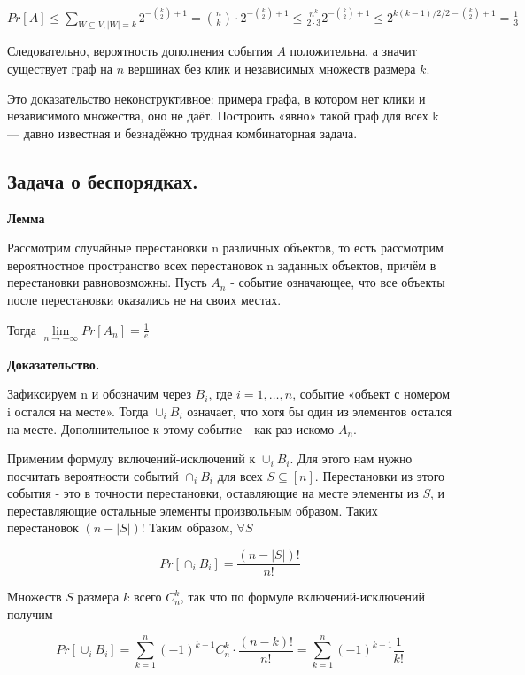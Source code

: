 \documentclass[a4paper, 10pt]{article}
\begin{document}
\begin{center}
    $\displaystyle Pr[A] \leqslant \sum_{W \subseteq V,|W| = k} 2^{-\binom{k}{2} + 1} = \binom{n}{k} \cdot 2^{-\binom{k}{2} + 1} \leqslant \frac{n^k}{2 \cdot 3} 2^{-\binom{k}{2} + 1} \leqslant 2^{k(k-1)/2 /2-\binom{k}{2} + 1} = \frac{1}{3}$
\end{center}

Следовательно, вероятность дополнения события $A$ положительна, а значит существует граф на $n$ вершинах без клик и независимых множеств размера $k$.

Это доказательство неконструктивное: примера графа, в котором нет клики и независимого множества, оно не даёт. Построить «явно» такой граф для всех k — давно известная и безнадёжно трудная комбинаторная задача.

\subsection{Задача о беспорядках.}

\textbf{Лемма}

Рассмотрим случайные перестановки n различных объектов, то есть рассмотрим вероятностное пространство всех перестановок n заданных объектов, причём в перестановки равновозможны. Пусть $A_n$ - событие означающее, что все объекты после перестановки оказались не на своих местах.

Тогда $\lim \limits_{n \to +\infty} Pr[A_n] = \frac{1}{e}$

\textbf{Доказательство.}

Зафиксируем n и обозначим через $B_i$, где $i = 1, \dots, n$, событие «объект с номером i остался на месте». Тогда $\cup_{i} B_i$ означает, что хотя бы один из элементов остался на месте. Дополнительное к этому событие - как раз искомо $A_n$.

Применим формулу включений-исключений к $\cup_{i} B_i$. Для этого нам нужно посчитать вероятности событий $\cap_{i} B_i$ для всех $S \subseteq [n]$. Перестановки из этого события - это в точности перестановки, оставляющие на месте элементы из $S$, и переставляющие остальные элементы произвольным образом. Таких перестановок $(n - |S|)!$ Таким образом, $\forall S$

$$Pr[\cap_{i} B_i] = \frac{(n - |S|)!}{n!}$$

Множеств $S$ размера $k$ всего $C_n^k$, так что по формуле включений-исключений получим

$$Pr[\cup_{i} B_i] = \sum_{k = 1}^n (-1)^{k + 1} C_n^k \cdot \frac{(n - k)!}{n!} = \sum_{k = 1}^n (-1)^{k + 1} \frac{1}{k!}$$
\end{document}
